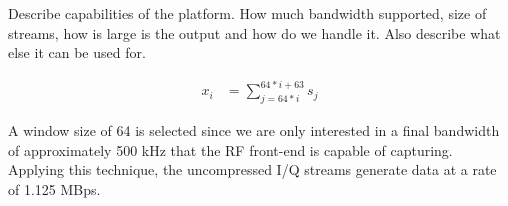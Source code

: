 {\color{blue} Describe capabilities of the platform. How much bandwidth supported, size of streams, how is large is the output and how do we handle it. Also describe what else it can be used for.}

\begin{align*}
x_i &= \sum_{j=64*i}^{64*i + 63} s_j
\end{align*}

A window size of 64 is selected since we are only interested in a final
bandwidth of approximately 500 kHz that the RF front-end is capable of
capturing. Applying this technique, the uncompressed I/Q streams generate data
at a rate of 1.125 MBps.

